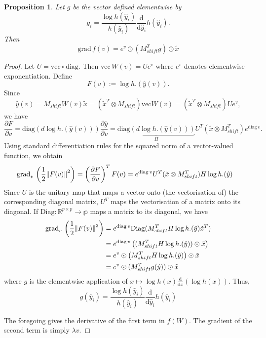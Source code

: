 \documentclass{article}
\newtheorem{proposition}{Proposition}
\begin{document}
\begin{proposition}
    Let $g$ be the vector defined elementwise by 
    $$
    g_i = \frac{\log h(\hat{y}_i)}{h(\hat{y}_i)} \frac{\mathrm{d}}{\mathrm{d}\hat{y}_i} h(\hat{y}_i)
    .$$
    Then 
    $$
    \mathrm{grad}\, f(v) = e^v \odot (M_{shift}^T g) \odot \tilde{x} 
    $$
\end{proposition}
\begin{proof}

Let $U = \mathrm{vec} \circ \mathrm{diag}$. Then $\mathrm{vec}\, W(v) = U e^v$ where $e^v$ denotes elementwise exponentiation.
Define $$
F(v) := \log h.(\hat{y}(v))
.$$
Since 
$$
\hat{y}(v) = M_{shift} W(v) \tilde{x}
=
(\tilde{x}^T \otimes M_{shift}) \mathrm{vec} W(v)
=
(\tilde{x}^T \otimes M_{shift}) U e^v
,$$
we have
$$
\frac{\partial F}{\partial v}
=
\mathrm{diag}(d \log h.(\hat{y}(v))) \frac{\partial \hat{y}}{\partial v}
=
\underbrace{\mathrm{diag}(d \log h.(\hat{y}(v)))}_H U^T (\tilde{x} \otimes M_{shift}^T) e^{\mathrm{diag}\, v}
.$$
Using standard differentiation rules for the squared norm of a vector-valued function, we obtain
\begin{align*}
\mathrm{grad}_v\, \left(\frac{1}{2} \norm{F(v)}^2 \right) =
\left(\frac{\partial F}{\partial v}\right)^T F(v)
&= e^{\mathrm{diag}\, v} U^T (\tilde{x} \otimes M_{shift}^T) H \log h.(\hat{y})
\end{align*}
Since $U$ is the unitary map that maps a vector onto (the vectorisation of) the corresponding diagonal matrix, $U^T$ maps the vectorisation of a matrix onto its diagonal. If $\mathrm{Diag}: \mathbb{R}^{p \times p} \rightarrow \mathbb{p}$ maps a matrix to its diagonal, we have 
\begin{align*}
\mathrm{grad}_v\, \left(\frac{1}{2} \norm{F(v)}^2 \right)
&=
e^{\mathrm{diag}\, v} \mathrm{Diag}(M_{shift}^T H \log h.(\hat{y}) \tilde{x}^T) \\
&=
e^{\mathrm{diag}\, v} \left((M_{shift}^T H \log h.(\hat{y})) \odot \tilde{x}\right) \\
&=
e^{v} \odot \left(M_{shift}^T H \log h.(\hat{y})\right) \odot \tilde{x} \\
&=
e^v \odot (M_{shift}^T g(\hat{y})) \odot \tilde{x}
\end{align*}
where $g$ is the elementwise application of $x \mapsto \log h(x) \frac{\mathrm{d}}{\mathrm{d}x}(\log h(x))$. Thus, 
$$
g(\hat{y}_i) = \frac{\log h(\hat{y}_i)}{h(\hat{y}_i)} \frac{\mathrm{d}}{\mathrm{d}\hat{y}_i} h(\hat{y}_i)
$$


The foregoing gives the derivative of the first term in $f(W)$. The gradient of the second term is simply $\lambda v$.


\end{proof}
\end{document}
